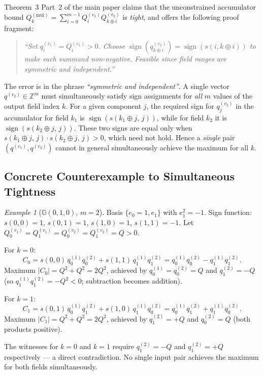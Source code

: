 \documentclass[11pt,a4paper]{article}
\theoremstyle{definition}
\theoremstyle{plain}
\theoremstyle{remark}
\newtheorem{example}{Example}[section]
\newcommand{\GA}{\mathbb{G}}
\begin{document}
Theorem~3 Part~2 of the main paper claims that the unconstrained
accumulator bound $Q_k^{(\mathrm{mul})} = \sum_{i=0}^{m-1}
Q_i^{(v_1)} Q_{k\oplus i}^{(v_2)}$ is \emph{tight}, and
offers the following proof fragment:

\begin{quote}
\emph{``Set $q_i^{(v_1)} = Q_i^{(v_1)} > 0$.
Choose $\operatorname{sign}(q_{k\oplus i}^{(v_2)}) =
\operatorname{sign}(s(i, k\oplus i))$ to make each summand non-negative.
Feasible since field ranges are symmetric and
independent.''}
\end{quote}

\noindent The error is in the phrase \emph{``symmetric and independent''}.
A single vector $q^{(v_2)} \in \mathbb{Z}^m$ must simultaneously satisfy
sign assignments for \emph{all} $m$ values of the output field index $k$.
For a given component $j$, the required sign for $q^{(v_2)}_j$ in the
accumulator for field $k_1$ is $\operatorname{sign}(s(k_1 \oplus j,\, j))$,
while for field $k_2$ it is $\operatorname{sign}(s(k_2 \oplus j,\, j))$.
These two signs are equal only when
$s(k_1 \oplus j,\, j) \cdot s(k_2 \oplus j,\, j) > 0$, which need not hold.
Hence a \emph{single} pair $(q^{(v_1)}, q^{(v_2)})$ cannot in general
simultaneously achieve the maximum for all $k$.

\subsection{Concrete Counterexample to Simultaneous Tightness}
\label{sec:gap1-counter}

\begin{example}[$\GA(0,1,0)$, $m=2$]
\label{ex:counterexample}
Basis $\{e_0=1, e_1\}$ with $e_1^2 = -1$.
Sign function:
$s(0,0)=1$, $s(0,1)=1$, $s(1,0)=1$, $s(1,1)=-1$.
Let $Q_0^{(v_1)}=Q_1^{(v_1)}=Q_0^{(v_2)}=Q_1^{(v_2)}=Q>0$.

For $k=0$:
\[
   C_0 = s(0,0)\,q_0^{(1)}q_0^{(2)} + s(1,1)\,q_1^{(1)}q_1^{(2)}
       = q_0^{(1)}q_0^{(2)} - q_1^{(1)}q_1^{(2)}.
\]
Maximum $|C_0| = Q^2 + Q^2 = 2Q^2$, achieved by
$q_0^{(1)}=q_0^{(2)}=Q$ and $q_1^{(2)} = -Q$
(so $q_1^{(1)}q_1^{(2)} = -Q^2 < 0$; subtraction becomes addition).

For $k=1$:
\[
   C_1 = s(0,1)\,q_0^{(1)}q_1^{(2)} + s(1,0)\,q_1^{(1)}q_0^{(2)}
       = q_0^{(1)}q_1^{(2)} + q_1^{(1)}q_0^{(2)}.
\]
Maximum $|C_1| = Q^2 + Q^2 = 2Q^2$, achieved by
$q_1^{(2)} = +Q$ and $q_0^{(2)} = Q$ (both products positive).

The witnesses for $k=0$ and $k=1$ require $q_1^{(2)} = -Q$ and
$q_1^{(2)} = +Q$ respectively --- a direct contradiction.
No single input pair achieves the maximum for both fields simultaneously.
\end{example}
\end{document}
